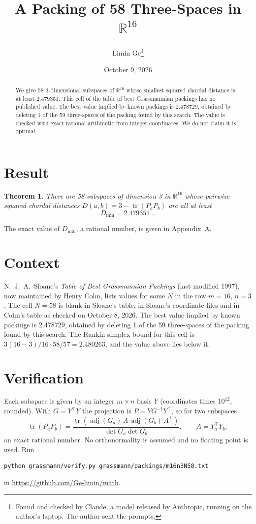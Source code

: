 \documentclass[11pt,a4paper]{article}
\title{A Packing of 58 Three-Spaces in $\mathbb{R}^{16}$}
\author{Limin Ge\thanks{Found and checked by Claude, a model released by Anthropic, running on the author's laptop. The author sent the prompts.}}
\date{October 9, 2026}
\newtheorem*{theorem}{Theorem}
\begin{document}
\maketitle
\begin{abstract}
We give 58 3-dimensional subspaces of $\mathbb{R}^{16}$ whose smallest squared chordal distance is at least 2.479351. This cell of the table of best Grassmannian packings has no published value. The best value implied by known packings is 2.478729, obtained by deleting 1 of the 59 three-spaces of the packing found by this search. The value is checked with exact rational arithmetic from integer coordinates. We do not claim it is optimal.
\end{abstract}

\section{Result}
\begin{theorem}
There are 58 subspaces of dimension 3 in $\mathbb{R}^{16}$ whose pairwise squared chordal distances $D(a,b) = 3 - \operatorname{tr}(P_aP_b)$ are all at least
\[ D_{\min} = 2.479351\ldots \]
\end{theorem}
The exact value of $D_{\min}$, a rational number, is given in Appendix~A.


\section{Context}
N.~J.~A.~Sloane's \emph{Table of Best Grassmannian Packings} (last modified 1997), now maintained by Henry Cohn, lists values for some $N$ in the row $m=16$, $n=3$. The cell $N=58$ is blank in Sloane's table, in Sloane's coordinate files and in Cohn's table as checked on October 8, 2026. The best value implied by known packings is 2.478729, obtained by deleting 1 of the 59 three-spaces of the packing found by this search. The Rankin simplex bound for this cell is $3(16-3)/16\cdot 58/57 = 2.480263$, and the value above lies below it.


\section{Verification}
Each subspace is given by an integer $m\times n$ basis $Y$ (coordinates times $10^{12}$, rounded). With $G=Y^\top Y$ the projection is $P=YG^{-1}Y^\top$, so for two subspaces
\[ \operatorname{tr}(P_aP_b)=\frac{\operatorname{tr}(\operatorname{adj}(G_a)\,A\,\operatorname{adj}(G_b)\,A^\top)}{\det G_a\det G_b},\qquad A=Y_a^\top Y_b, \]
an exact rational number. No orthonormality is assumed and no floating point is used. Run
\begin{verbatim}
python grassmann/verify.py grassmann/packings/m16n3N58.txt
\end{verbatim}
in \url{https://github.com/Ge-limin/math}.
\end{document}
